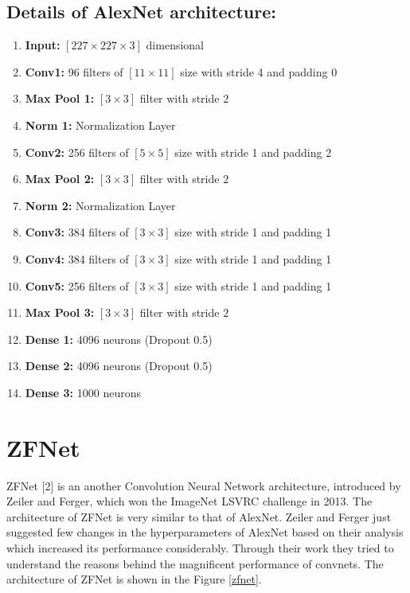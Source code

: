 \documentclass{article} %
\begin{document}
	\subsection*{Details of AlexNet architecture:}
	\begin{enumerate}
		\item \textbf{Input:} $[227 \times 227 \times 3]$ dimensional
		\item \textbf{Conv1:} 96 filters of $[11 \times 11]$ size with stride 4 and padding 0
		\item \textbf{Max Pool 1:} $[3 \times 3]$ filter with stride $2$
		\item \textbf{Norm 1:} Normalization Layer
		\item \textbf{Conv2:} 256 filters of $[5 \times 5]$ size with stride 1 and padding 2
		\item \textbf{Max Pool 2:} $[3 \times 3]$ filter with stride $2$
		\item \textbf{Norm 2:} Normalization Layer
		\item \textbf{Conv3:} 384 filters of $[3 \times 3]$ size with stride 1 and padding 1
		\item \textbf{Conv4:} 384 filters of $[3 \times 3]$ size with stride 1 and padding 1
		\item \textbf{Conv5:} 256 filters of $[3 \times 3]$ size with stride 1 and padding 1
		\item \textbf{Max Pool 3:} $[3 \times 3]$ filter with stride $2$
		\item \textbf{Dense 1:} 4096 neurons (Dropout 0.5)
		\item \textbf{Dense 2:} 4096 neurons (Dropout 0.5)
		\item \textbf{Dense 3:} 1000 neurons
	\end{enumerate}


	\section{ZFNet}
	ZFNet [2] is an another Convolution Neural Network architecture, introduced by Zeiler and Ferger, which won the ImageNet LSVRC challenge in 2013. The architecture of ZFNet is very similar to that of AlexNet. Zeiler and Ferger just suggested few changes in the hyperparameters of AlexNet based on their analysis which increased its performance considerably. Through their work they tried to understand the reasons behind the magnificent performance of convnets. The architecture of ZFNet is shown in the Figure \ref{zfnet}.
	
\end{document}
